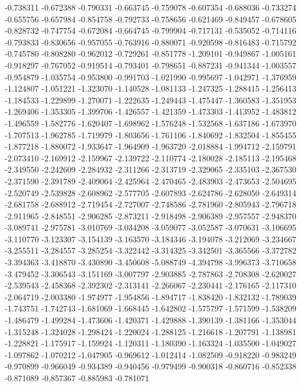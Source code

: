 -0.738311
-0.672388
-0.790331
-0.663745
-0.759078
-0.607354
-0.688036
-0.733274
-0.655756
-0.657984
-0.854758
-0.792733
-0.758656
-0.621469
-0.849457
-0.678605
-0.828732
-0.747754
-0.672084
-0.664745
-0.799904
-0.717131
-0.535052
-0.714116
-0.793833
-0.830656
-0.957055
-0.763916
-0.880071
-0.920598
-0.816483
-0.715792
-0.745780
-0.808280
-0.962012
-0.729261
-0.851778
-1.209101
-0.949867
-1.005161
-0.918297
-0.767052
-0.919514
-0.793401
-0.798651
-0.887231
-0.941344
-1.003557
-0.954879
-1.035754
-0.953800
-0.991703
-1.021990
-0.995697
-1.042971
-1.376959
-1.124807
-1.051221
-1.323070
-1.140528
-1.081133
-1.247325
-1.288415
-1.256413
-1.184533
-1.229899
-1.270071
-1.222635
-1.249443
-1.475447
-1.360583
-1.351953
-1.269406
-1.353305
-1.399706
-1.426557
-1.421359
-1.473303
-1.413952
-1.483812
-1.496559
-1.582776
-1.620407
-1.698962
-1.576248
-1.532568
-1.637186
-1.673970
-1.707513
-1.962785
-1.719979
-1.803656
-1.761106
-1.840692
-1.832504
-1.855455
-1.877218
-1.880072
-1.933647
-1.964909
-1.963720
-2.018884
-1.994712
-2.159791
-2.073410
-2.169912
-2.159967
-2.139722
-2.110774
-2.180028
-2.185113
-2.195468
-2.349550
-2.242609
-2.284932
-2.311266
-2.313719
-2.329065
-2.335103
-2.367530
-2.371590
-2.391789
-2.409064
-2.425964
-2.470465
-2.483903
-2.473653
-2.504695
-2.520749
-2.539828
-2.608962
-2.577705
-2.607893
-2.624786
-2.628050
-2.649314
-2.681758
-2.688912
-2.719454
-2.727007
-2.748586
-2.781960
-2.805943
-2.796718
-2.911965
-2.848551
-2.906285
-2.873211
-2.918498
-2.906389
-2.957557
-2.948370
-3.089741
-2.975781
-3.010769
-3.034208
-3.059077
-3.052587
-3.070631
-3.106695
-3.110770
-3.123307
-3.154139
-3.163570
-3.184346
-3.194078
-3.212069
-3.234667
-3.255511
-3.284557
-3.285254
-3.322442
-3.314325
-3.342501
-3.365566
-3.372782
-3.394363
-3.418870
-3.430890
-3.450608
-5.088749
-4.394798
-3.996373
-3.710658
-3.479452
-3.306543
-3.151169
-3.007797
-2.903885
-2.787863
-2.708308
-2.620027
-2.539543
-2.458368
-2.392302
-2.313141
-2.266067
-2.230441
-2.176165
-2.117310
-2.064719
-2.003380
-1.974977
-1.954856
-1.894717
-1.838420
-1.832132
-1.789039
-1.743751
-1.742743
-1.681069
-1.668445
-1.642802
-1.575797
-1.571599
-1.538209
-1.486479
-1.499284
-1.473606
-1.420371
-1.429888
-1.390139
-1.381166
-1.353044
-1.315248
-1.324028
-1.298424
-1.220024
-1.288125
-1.216618
-1.207791
-1.138981
-1.228821
-1.175917
-1.159924
-1.120311
-1.180390
-1.163324
-1.035500
-1.049027
-1.097862
-1.070212
-1.047905
-0.969612
-1.012414
-1.082509
-0.918220
-0.983249
-0.970899
-0.966049
-0.934389
-0.940456
-0.979499
-0.900318
-0.860716
-0.852338
-0.871089
-0.857367
-0.885983
-0.781071
